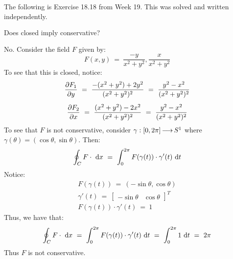 The following is Exercise 18.18 from Week 19. This was solved and written
independently.

\begin{exr}[num=18.18]
    Does closed imply conservative?
\end{exr}

\begin{pf}
    No. Consider the field $ F $ given by:
    \begin{equation*}
        F(x, y) \ = \ \frac{-y}{x^{2}+y^{2}}, \frac{x}{x^{2}+y^{2}}
    \end{equation*}
    To see that this is closed, notice:
    \begin{gather*}
        \frac{\p F_{1}}{\p y} \ = \ \frac{-(x^{2}+y^{2})+2y^{2}}
        {(x^{2}+y^{2})^{2}} \ = \ \frac{y^{2}-x^{2}}{(x^{2}+y^{2})^{2}} \vsp
        \frac{\p F_{2}}{\p x} \ = \ \frac{(x^{2}+y^{2})-2x^{2}}
        {(x^{2}+y^{2})^{2}} \ = \ \frac{y^{2}-x^{2}}{(x^{2}+y^{2})^{2}}
    \end{gather*}
    To see that $ F $ is not conservative, consider $ \gamma:[0, 2\pi]\operatorname{\longrightarrow}
    S^{1} $ where $ \gamma(\theta) = (\cos\theta, \sin\theta) $. Then:
    \begin{equation*}
        \oint_{C}F\cdot\di x \ = \ \int^{2\pi}_{0}F(\gamma(t))\cdot
        \gamma'(t)\di t
    \end{equation*}
    Notice:
    \begin{gather*}
        F(\gamma(t)) \ = \ (-\sin\theta, \cos\theta) \\
        \gamma'(t) \ = \
        \begin{bmatrix}
            -\sin\theta & \cos\theta
        \end{bmatrix}^{T} \\
        F(\gamma(t))\cdot\gamma'(t) \ = \ 1
    \end{gather*}
    Thus, we have that:
    \begin{equation*}
        \oint_{C}F\cdot\textrm{ d} x \ = \
        \int_{0}^{2\pi}F(\gamma(t))\cdot\gamma'(t)\textrm{ d} t \ = \
        \int_{0}^{2\pi}1\textrm{ d} t \ = \ 2\pi
    \end{equation*}
    Thus $ F $ is not conservative.
\end{pf}
